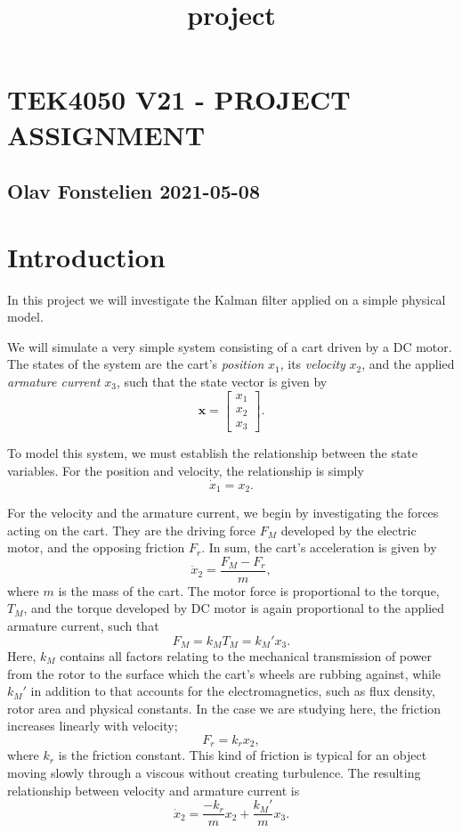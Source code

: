 \documentclass[11pt]{article}
\title{project}
\begin{document}
    
    
    

    
    \hypertarget{tek4050-v21---project-assignment}{%
\section*{TEK4050 V21 - PROJECT
ASSIGNMENT}\label{tek4050-v21---project-assignment}}

\hypertarget{olav-fuxf8nstelien-2021-05-08}{%
\subsection*{Olav Fonstelien
2021-05-08}\label{olav-fuxf8nstelien-2021-05-08}}

    \hypertarget{introduction}{%
\section*{Introduction}\label{introduction}}

In this project we will investigate the Kalman filter applied on a
simple physical model.

    We will simulate a very simple system consisting of a cart driven by a
DC motor. The states of the system are the cart's \emph{position}
\(x_1\), its \emph{velocity} \(x_2\), and the applied \emph{armature
current} \(x_3\), such that the state vector is given by \[
\mathbf{x} = 
\begin{bmatrix}
x_1 \\ x_2 \\ x_3
\end{bmatrix}.
\]

To model this system, we must establish the relationship between the
state variables. For the position and velocity, the relationship is
simply \[
\dot{x}_1 = x_2.
\]

For the velocity and the armature current, we begin by investigating the
forces acting on the cart. They are the driving force \(F_M\) developed
by the electric motor, and the opposing friction \(F_r\). In sum, the
cart's acceleration is given by \[
\dot{x}_2 = \frac{F_M - F_r}{m},
\] where \(m\) is the mass of the cart. The motor force is proportional
to the torque, \(T_M\), and the torque developed by DC motor is again
proportional to the applied armature current, such that \[
F_M = k_M T_M = k_M'x_3.
\] Here, \(k_M\) contains all factors relating to the mechanical
transmission of power from the rotor to the surface which the cart's
wheels are rubbing against, while \(k_M'\) in addition to that accounts
for the electromagnetics, such as flux density, rotor area and physical
constants. In the case we are studying here, the friction increases
linearly with velocity; \[
F_r = k_r x_2,
\] where \(k_r\) is the friction constant. This kind of friction is
typical for an object moving slowly through a viscous without creating
turbulence. The resulting relationship between velocity and armature
current is \[
\dot{x}_2 = \frac{-k_r}{m}x_2 + \frac{k_M'}{m}x_3.
\]
\end{document}
